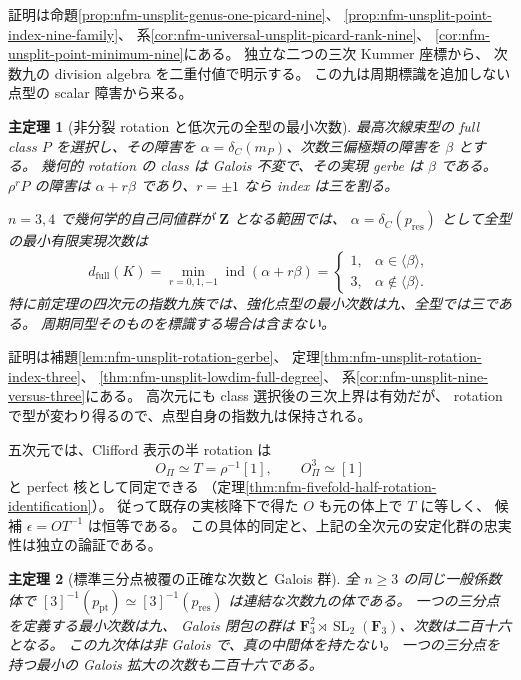 \documentclass[11pt,a4paper]{ltjsarticle}
\numberwithin{equation}{section}
\newtheorem{maintheorem}{主定理}
\begin{document}
証明は命題\ref{prop:nfm-unsplit-genus-one-picard-nine}、
\ref{prop:nfm-unsplit-point-index-nine-family}、
系\ref{cor:nfm-universal-unsplit-picard-rank-nine}、
\ref{cor:nfm-unsplit-point-minimum-nine}にある。
独立な二つの三次 Kummer 座標から、
次数九の division algebra を二重付値で明示する。
この九は周期標識を追加しない点型の scalar 障害から来る。

\begin{maintheorem}[非分裂 rotation と低次元の全型の最小次数]
\label{main:nfm-unsplit-full-minimum}
最高次線束型の full class $P$ を選択し、その障害を
$\alpha=\delta_C(m_P)$、次数三偏極類の障害を $\beta$ とする。
幾何的 rotation の class は Galois 不変で、その実現 gerbe は $\beta$ である。
$\rho^rP$ の障害は $\alpha+r\beta$ であり、$r=\pm1$ なら index は三を割る。

$n=3,4$ で幾何学的自己同値群が $\mathbf Z$ となる範囲では、
$\alpha=\delta_C(p_{\mathrm{res}})$ として全型の最小有限実現次数は
\[
 d_{\mathrm{full}}(K)=\min_{r=0,1,-1}\operatorname{ind}(\alpha+r\beta)
 =\begin{cases}1,&\alpha\in\langle\beta\rangle,\\
 3,&\alpha\notin\langle\beta\rangle.
 \end{cases}
\]
特に前定理の四次元の指数九族では、強化点型の最小次数は九、全型では三である。
周期同型そのものを標識する場合は含まない。
\end{maintheorem}

証明は補題\ref{lem:nfm-unsplit-rotation-gerbe}、
定理\ref{thm:nfm-unsplit-rotation-index-three}、
\ref{thm:nfm-unsplit-lowdim-full-degree}、
系\ref{cor:nfm-unsplit-nine-versus-three}にある。
高次元にも class 選択後の三次上界は有効だが、
rotation で型が変わり得るので、点型自身の指数九は保持される。

五次元では、Clifford 表示の半 rotation は
\[
 O_\Pi\simeq T=\rho^{-1}[1],\qquad O_\Pi^3\simeq[1]
\]
と perfect 核として同定できる
（定理\ref{thm:nfm-fivefold-half-rotation-identification}）。
従って既存の実核降下で得た $O$ も元の体上で $T$ に等しく、
候補 $\epsilon=OT^{-1}$ は恒等である。
この具体的同定と、上記の全次元の安定化群の忠実性は独立の論証である。

\begin{maintheorem}[標準三分点被覆の正確な次数と Galois 群]
\label{main:nfm-third-division-monodromy}
全 $n\ge3$ の同じ一般係数体で
$[3]^{-1}(p_{\mathrm{pt}})\simeq[3]^{-1}(p_{\mathrm{res}})$ は連結な次数九の体である。
一つの三分点を定義する最小次数は九、
Galois 閉包の群は $\mathbf F_3^2\rtimes\operatorname{SL}_2(\mathbf F_3)$、次数は二百十六となる。
この九次体は非 Galois で、真の中間体を持たない。
一つの三分点を持つ最小の Galois 拡大の次数も二百十六である。
\end{maintheorem}
\end{document}
